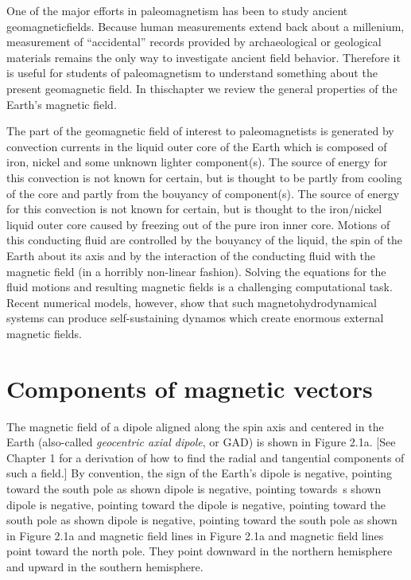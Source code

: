 \documentclass[draft,plain]{tauxe}
\begin{document}
\maketitle

One of the major efforts in paleomagnetism has been to study ancient geomagneticfields. Because
human measurements extend back about a millenium, measurement of ``accidental'' records provided
by archaeological or geological materials remains the only way to investigate ancient field
behavior. Therefore it is useful for students of paleomagnetism to understand something about the
present geomagnetic field. In thischapter we review the general properties of the Earth's magnetic
field.

The part of the geomagnetic field of interest to paleomagnetists is generated by convection currents
in the liquid outer core of the Earth which is composed of iron, nickel and some unknown lighter
component(s). The source of energy for this convection is not known for certain, but is thought to be
partly from cooling of the core and partly from the bouyancy of component(s). The source of energy
for this convection is not known for certain, but is thought to the iron/nickel liquid outer core caused
by freezing out of the pure iron inner core. Motions of this conducting fluid are controlled by the
bouyancy of the liquid, the spin of the Earth about its axis and by the interaction of the conducting fluid
with the magnetic field (in a horribly non-linear fashion). Solving the equations for the fluid
motions and resulting magnetic fields is a challenging computational task. Recent numerical models,
however, show that such magnetohydrodynamical systems can produce self-sustaining dynamos
which create enormous external magnetic fields.

\section{Components of magnetic vectors}

The magnetic field of a dipole aligned along the spin axis and centered in the Earth (also-called
{\it geocentric axial dipole}, or GAD) is shown in Figure 2.1a. [See Chapter 1 for a derivation of how
to find the radial and tangential components of such a field.] By convention, the sign of the Earth's
dipole is negative, pointing toward the south pole as shown dipole is negative, pointing towards~s
shown dipole is negative, pointing toward the dipole is negative, pointing toward the south pole
as shown dipole is negative, pointing toward the south pole as shown in Figure 2.1a and magnetic
field lines in Figure 2.1a and magnetic field lines point toward the north pole. They point downward
in the northern hemisphere and upward in the southern hemisphere.
\end{document}
